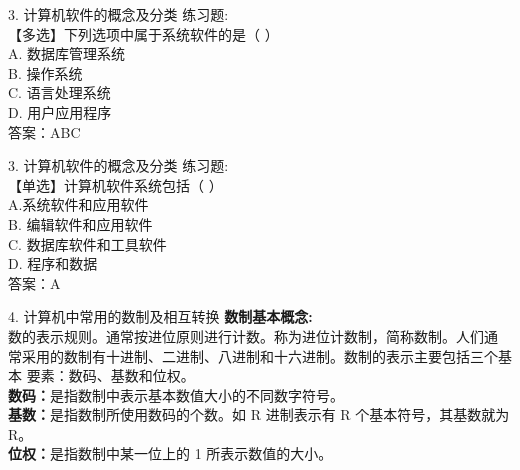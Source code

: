 \documentclass[aspectratio=169]{beamer}
\begin{document}
\begin{frame}[t]{3. 计算机软件的概念及分类} \vspace{20pt}
    练习题:\\
    【多选】下列选项中属于系统软件的是（ ）\\
A. 数据库管理系统\\ B. 操作系统\\
C. 语言处理系统\\ D. 用户应用程序\\
答案：ABC\\
\end{frame}



\begin{frame}[t]{3. 计算机软件的概念及分类} \vspace{20pt}
    练习题:\\
    【单选】计算机软件系统包括（ ）\\
A.系统软件和应用软件\\
B. 编辑软件和应用软件\\
C. 数据库软件和工具软件\\
D. 程序和数据\\
答案：A\\
\end{frame}

\begin{frame}[t]{4. 计算机中常用的数制及相互转换} \vspace{20pt}
    \textbf{数制基本概念:}\\
    数的表示规则。通常按进位原则进行计数。称为进位计数制，简称数制。人们通
    常采用的数制有十进制、二进制、八进制和十六进制。数制的表示主要包括三个基本
    要素：数码、基数和位权。\\

    \textbf{数码：}是指数制中表示基本数值大小的不同数字符号。\\
    \textbf{基数：}是指数制所使用数码的个数。如 R 进制表示有 R 个基本符号，其基数就为 R。\\
    \textbf{位权：}是指数制中某一位上的 1 所表示数值的大小。\\ 
\end{frame}
\end{document}
